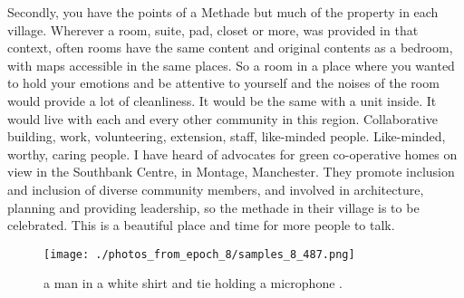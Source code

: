 \documentclass{article}%
\begin{document}
Secondly, you have the points of a Methade but much of the property in each village. Wherever a room, suite, pad, closet or more, was provided in that context, often rooms have the same content and original contents as a bedroom, with maps accessible in the same places. So a room in a place where you wanted to hold your emotions and be attentive to yourself and the noises of the room would provide a lot of cleanliness. It would be the same with a unit inside. It would live with each and every other community in this region.\newline%
Collaborative building, work, volunteering, extension, staff, like{-}minded people. Like{-}minded, worthy, caring people.\newline%
I have heard of advocates for green co{-}operative homes on view in the Southbank Centre, in Montage, Manchester. They promote inclusion and inclusion of diverse community members, and involved in architecture, planning and providing leadership, so the methade in their village is to be celebrated.\newline%
This is a beautiful place and time for more people to talk.\newline%

%


\begin{figure}[h!]%
\centering%
\texttt{[image: ./photos\_from\_epoch\_8/samples\_8\_487.png]}%
\caption{a man in a white shirt and tie holding a microphone .}%
\end{figure}

%
\end{document}
